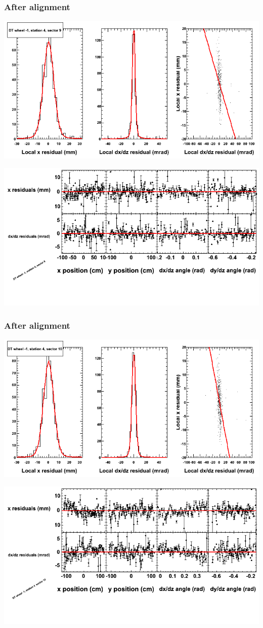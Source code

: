 \documentclass[compress]{beamer}
\begin{document}
\begin{frame}
\frametitle{After alignment}
\includegraphics[width=0.7\linewidth]{NOV4_fitfunctions/MBwhBst4sec09_bellcurves.png}

\includegraphics[width=0.7\linewidth]{NOV4_fitfunctions/MBwhBst4sec09_polynomials.png}
\end{frame}

\begin{frame}
\frametitle{After alignment}
\includegraphics[width=0.7\linewidth]{NOV4_fitfunctions/MBwhBst4sec10_bellcurves.png}

\includegraphics[width=0.7\linewidth]{NOV4_fitfunctions/MBwhBst4sec10_polynomials.png}
\end{frame}
\end{document}
